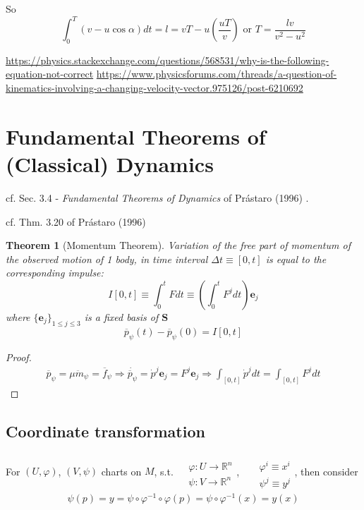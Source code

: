 \documentclass[10pt]{amsart}
\newtheorem{theorem}{Theorem}
\begin{document}
\begin{multicols*}{2}
So
\begin{equation}
	\int_0^T (v-u\cos{\alpha}) dt = l = vT - u \left( \frac{u T}{v} \right) \text{ or } \boxed{ T = \frac{lv}{ v^2 - u^2 } }
\end{equation}

\url{https://physics.stackexchange.com/questions/568531/why-is-the-following-equation-not-correct}
\url{https://www.physicsforums.com/threads/a-question-of-kinematics-involving-a-changing-velocity-vector.975126/post-6210692}

\section{Fundamental Theorems of (Classical) Dynamics}

cf. Sec. 3.4 - \emph{Fundamental Theorems of Dynamics} of Pr\'{a}staro (1996) \cite{Pras1996}.

cf. Thm. 3.20 of Pr\'{a}staro (1996) \cite{Pras1996}
\begin{theorem}[Momentum Theorem]
	Variation of the free part of momentum of the observed motion of 1 body, in time interval $\Delta t \equiv [0, t]$ is equal to the corresponding impulse:
	\begin{equation}
	I[0,t] \equiv \int_0^t Fdt \equiv \left( \int_0^t F^j dt \right) \mathbf{e}_j
	\end{equation}
	where $\lbrace \mathbf{e}_j \rbrace_{1 \leq j \leq 3}$ is a fixed basis of $\mathbf{S}$
	\begin{equation}
		\overline{p}_{\psi}(t) - \overline{p}_{\psi}(0) = I[0,t]
	\end{equation}
\end{theorem}

\begin{proof}
	\[
\begin{gathered}
\overline{p}_{\psi} = \mu \ddot{m}_{\psi} = \overline{f}_{\psi} \Longrightarrow \dot{ \overline{p}_{\psi}} = \dot{p}^j \mathbf{e}_j = F^j \textbf{e}_j \Longrightarrow \int_{[0,t]} \dot{p}^j dt = \int_{[0,t]}F^j dt
\end{gathered}
	\]
	\end{proof}

\subsection{Coordinate transformation}

For $(U, \varphi)$, $(V, \psi)$ charts on $M$, s.t. $\begin{aligned} & \quad \\ 
	& \varphi : U \to \mathbb{R}^n \\
	 & \psi: V \to \mathbb{R}^n \end{aligned}$, \quad \, $\begin{aligned} & \quad \\ 
	 & \varphi^i \equiv x^i \\
	 & \psi^j \equiv y^j \end{aligned}$, then consider 
\[
\begin{gathered}
\psi(p) = y = \psi \circ \varphi^{-1} \circ \varphi(p) = \psi \circ \varphi^{-1}(x) = y(x)
\end{gathered}  
\]


\end{multicols*}
\end{document}
